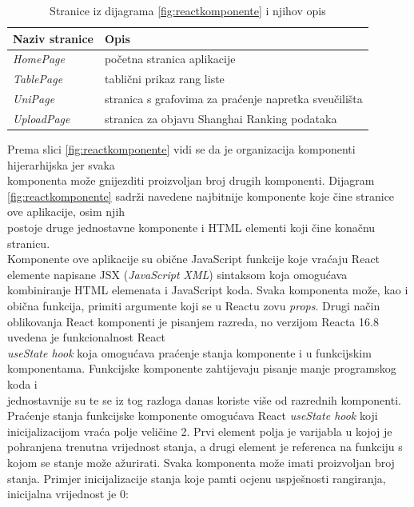 \documentclass[times, utf8, zavrsni]{fer}
\begin{document}
       \begin{table}[htb]
        \caption{Stranice iz dijagrama \ref{fig:reactkomponente} i njihov opis}
            \label{tbl:stranice}
            \centering
            \begin{tabular}{ll} \hline
            Naziv stranice & Opis\\ \hline
            \emph{HomePage} & početna stranica aplikacije\\
            \emph{TablePage} & tablični prikaz rang liste\\
            \emph{UniPage} & stranica s grafovima za praćenje napretka sveučilišta\\
            \emph{UploadPage} & stranica za objavu Shanghai Ranking podataka
            \end{tabular} 
            \end{table} 
            \FloatBarrier
Prema slici \ref{fig:reactkomponente} vidi se da je organizacija komponenti hijerarhijska jer svaka \\komponenta može gnijezditi proizvoljan broj drugih komponenti.
Dijagram \ref{fig:reactkomponente} sadrži navedene najbitnije komponente koje čine stranice ove aplikacije, osim njih \\postoje druge jednostavne komponente i HTML elementi 
koji čine konačnu stranicu. \\Komponente ove aplikacije su obične JavaScript funkcije koje vraćaju React elemente napisane JSX (\emph{JavaScript XML}) sintaksom koja 
omogućava kombiniranje HTML elemenata i JavaScript koda. Svaka komponenta može, kao i obična funkcija, primiti argumente koji se u Reactu zovu \emph{props}.
Drugi način oblikovanja React komponenti je pisanjem razreda, no verzijom Reacta 16.8 uvedena je funkcionalnost React \\\emph{useState hook} koja omogućava 
praćenje stanja komponente i u funkcijskim komponentama. Funkcijske komponente zahtijevaju pisanje manje programskog koda i \\jednostavnije su te se iz tog
razloga danas koriste više od razrednih komponenti. 
Praćenje stanja funkcijske komponente omogućava React \emph{useState hook} koji \\inicijalizacijom vraća polje veličine 2. Prvi element polja je varijabla u kojoj 
je pohranjena trenutna vrijednost stanja, a drugi element je referenca na funkciju s kojom se stanje može ažurirati. Svaka komponenta može imati 
proizvoljan broj stanja. Primjer inicijalizacije stanja koje pamti ocjenu uspješnosti rangiranja, inicijalna vrijednost je 0:
\end{document}
